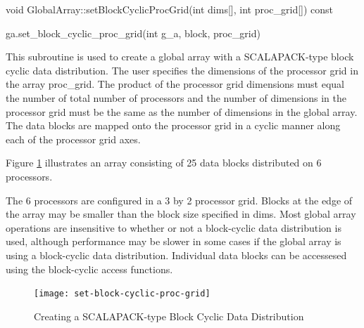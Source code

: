 \documentclass[10pt]{article}
\begin{document}
\begin{cxxapi}
\begin{cxxcode}
void GlobalArray::setBlockCyclicProcGrid(int dims[], int proc_grid[]) const
\end{cxxcode}
\begin{funcargs}
\end{funcargs}
\end{cxxapi}

\begin{pyapi}
\begin{pycode}
ga.set_block_cyclic_proc_grid(int g_a, block, proc_grid)
\end{pycode}
\begin{funcargs}
\end{funcargs}
\end{pyapi}

\gcoll

\begin{desc}

This subroutine is used to create a global array with a SCALAPACK-type block
cyclic data distribution. The user specifies the dimensions of the processor
grid in the array proc_grid. The product of the processor grid dimensions must
equal the number of total number of processors and the number of dimensions in
the processor grid must be the same as the number of dimensions in the global
array. The data blocks are mapped onto the processor grid in a cyclic manner
along each of the processor grid axes.

Figure \ref{setblkcyprocgrid} illustrates an array consisting of 25 data blocks
distributed on 6 processors.

The 6 processors are configured in a 3 by 2 processor grid. Blocks at the edge
of the array may be smaller than the block size specified in dims.  Most global
array operations  are insensitive to whether or not a block-cyclic data
distribution is used, although performance may be slower in some cases if the
global array is using a block-cyclic data distribution. Individual data blocks
can be accessesed using the block-cyclic access functions.

\begin{figure}
\centering
\texttt{[image: set-block-cyclic-proc-grid]}
\caption{Creating a SCALAPACK-type Block Cyclic Data Distribution}
\label{setblkcyprocgrid}
\end{figure}

\end{desc}
\end{document}
